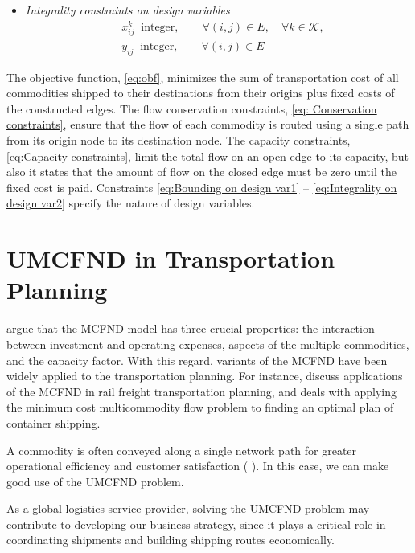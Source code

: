 \begin{itemize}
    \item\textit{Integrality constraints on design variables}
        \begin{align}
            &x_{ij}^k \ \text{ integer},\qquad  \forall (i, j) \in E, \quad\forall k \in \mathcal{K},\\
            &y_{ij} \ \text{ integer}, \qquad  \forall (i, j) \in E \label{eq:Integrality on design var2}
        \end{align}
\end{itemize}

The objective function, \eqref{eq:obf}, minimizes the sum of transportation cost of all commodities shipped to their destinations from their origins plus fixed costs of the constructed edges. The flow conservation constraints, \eqref{eq: Conservation constraints}, ensure that the flow of each commodity is routed using a single path from its origin node to its destination node. The capacity constraints, \eqref{eq:Capacity constraints}, limit the total flow on an open edge to its capacity, but also it states that the amount of flow on the closed edge must be zero until the fixed cost is paid. Constraints \eqref{eq:Bounding on design var1} -- \eqref{eq:Integrality on design var2} specify the nature of design variables.

\section{UMCFND in Transportation Planning}
\label{sec:applictions of UMCFND}

\citeauthor{gendron2011} \cite{gendron2011} argue that the MCFND model has three crucial properties: the interaction between investment and operating expenses, aspects of the multiple commodities, and the capacity factor. With this regard, variants of the MCFND have been widely applied to the transportation planning. For instance,  \citeauthor{yaghini2012multicommodity} \cite{yaghini2012multicommodity} discuss applications of the MCFND in rail freight transportation planning, and \citeauthor{krile2004application} \cite{krile2004application} deals with applying the minimum cost multicommodity flow problem to finding an optimal plan of container shipping.

A commodity is often conveyed along a single network path for greater operational efficiency and customer satisfaction (\citeauthor{barnhart2000using} \cite{barnhart2000using}). In this case, we can make good use of the UMCFND problem.

As a global logistics service provider, solving the UMCFND problem may contribute to developing our business strategy, since it plays a critical role in coordinating shipments and building shipping routes economically. 
\clearpage